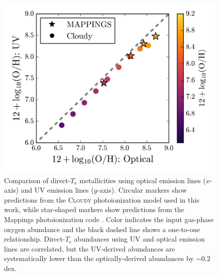 \documentclass[preprint2]{aastex62}
\newcommand{\Cloudy}{\textsc{Cloudy}\xspace}
\newcommand{\Te}{\ensuremath{T_{\mathrm{e}}}\xspace}
\begin{document}
\begin{figure}
  \begin{center}
    \includegraphics[width=\linewidth]{figs/A2.png}
    \caption{Comparison of direct-\Te metallicities using optical emission lines ($x$-axis) and UV emission lines ($y$-axis). Circular markers show predictions from the \Cloudy photoionization model used in this work, while star-shaped markers show predictions from the {\sc Mappings} photoionization code \citep{Kewley+2019}. Color indicates the input gas-phase oxygen abundance and the black dashed line shows a one-to-one relationship. Direct-\Te abundances using UV and optical emission lines are correlated, but the UV-derived abundances are systematically lower than the optically-derived abundances by $\sim0.2$\,dex.}
    \label{fig:UVoptZ}
  \end{center}
\end{figure}
\end{document}
